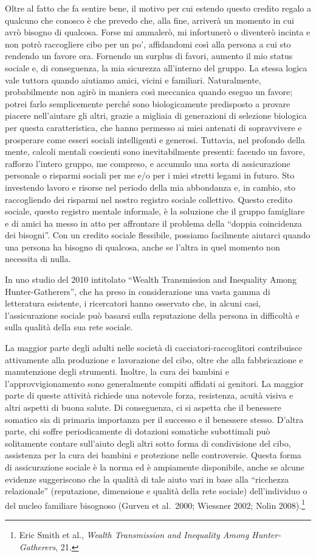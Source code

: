 \documentclass[
  a5paper,
  smalldemyvopaper,10pt,twoside,onecolumn,openright,extrafontsizes,hidelinks]{memoir}
\begin{document}
Oltre al fatto che fa sentire bene, il motivo per cui estendo questo
credito regalo a qualcuno che conosco è che prevedo che, alla fine,
arriverà un momento in cui avrò bisogno di qualcosa. Forse mi ammalerò,
mi infortunerò o diventerò incinta e non potrò raccogliere cibo per un
po', affidandomi così alla persona a cui sto rendendo un favore ora.
Fornendo un surplus di favori, aumento il mio status sociale e, di
conseguenza, la mia sicurezza all'interno del gruppo. La stessa logica
vale tuttora quando aiutiamo amici, vicini e familiari. Naturalmente,
probabilmente non agirò in maniera così meccanica quando eseguo un
favore; potrei farlo semplicemente perché sono biologicamente
predisposto a provare piacere nell'aiutare gli altri, grazie a migliaia
di generazioni di selezione biologica per questa caratteristica, che
hanno permesso ai miei antenati di sopravvivere e prosperare come esseri
sociali intelligenti e generosi. Tuttavia, nel profondo della mente,
calcoli mentali coscienti sono inevitabilmente presenti: facendo un
favore, rafforzo l'intero gruppo, me compreso, e accumulo una sorta di
assicurazione personale o risparmi sociali per me e/o per i miei stretti
legami in futuro. Sto investendo lavoro e risorse nel periodo della mia
abbondanza e, in cambio, sto raccogliendo dei risparmi nel nostro
registro sociale collettivo. Questo credito sociale, questo registro
mentale informale, è la soluzione che il gruppo famigliare e di amici ha
messo in atto per affrontare il problema della ``doppia coincidenza dei
bisogni''. Con un credito sociale flessibile, possiamo facilmente
aiutarci quando una persona ha bisogno di qualcosa, anche se l'altra in
quel momento non necessita di nulla.

In uno studio del 2010 intitolato ``Wealth Transmission and Inequality
Among Hunter-Gatherers'', che ha preso in considerazione una vasta gamma
di letteratura esistente, i ricercatori hanno osservato che, in alcuni
casi, l'assicurazione sociale può basarsi sulla reputazione della
persona in difficoltà e sulla qualità della sua rete sociale.

La maggior parte degli adulti nelle società di cacciatori-raccoglitori
contribuisce attivamente alla produzione e lavorazione del cibo, oltre
che alla fabbricazione e manutenzione degli strumenti. Inoltre, la cura
dei bambini e l'approvvigionamento sono generalmente compiti affidati ai
genitori. La maggior parte di queste attività richiede una notevole
forza, resistenza, acuità visiva e altri aspetti di buona salute. Di
conseguenza, ci si aspetta che il benessere somatico sia di primaria
importanza per il successo e il benessere stesso. D'altra parte, chi
soffre periodicamente di dotazioni somatiche subottimali può solitamente
contare sull'aiuto degli altri sotto forma di condivisione del cibo,
assistenza per la cura dei bambini e protezione nelle controversie.
Questa forma di assicurazione sociale è la norma ed è ampiamente
disponibile, anche se alcune evidenze suggeriscono che la qualità di
tale aiuto vari in base alla ``ricchezza relazionale'' (reputazione,
dimensione e qualità della rete sociale) dell'individuo o del nucleo
familiare bisognoso (Gurven et al.~2000; Wiessner 2002; Nolin
2008).\footnote{Eric Smith et al., \emph{Wealth Transmission and
  Inequality Among Hunter-Gatherers}, 21.}
\end{document}
